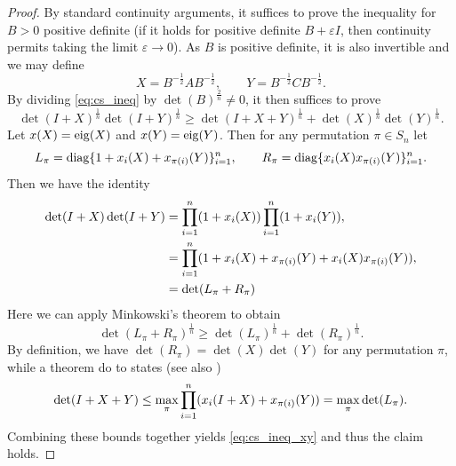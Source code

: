 \documentclass[notitlepage, 10pt]{article}
\begin{document}
\begin{proof}
    By standard continuity arguments, it suffices to prove the inequality for $B > 0$ positive definite (if it holds for positive definite $B+\varepsilon I$, then continuity permits taking the limit $\varepsilon \to 0$).
    As $B$ is positive definite, it is also invertible and we may define
    \begin{equation}
        X = B^{-\frac{1}{2}}AB^{-\frac{1}{2}}, \qquad
        Y = B^{-\frac{1}{2}}CB^{-\frac{1}{2}}.
    \end{equation}
    By dividing \cref{eq:cs_ineq} by $\det(B)^{\frac{2}{n}} \neq 0$, it then suffices to prove
    \begin{equation}
        \label{eq:cs_ineq_xy}
        \det (I+X)^{\frac1n} \det (I+Y)^{\frac1n} \geq \det (I+X+Y)^{\frac1n} + \det (X)^{\frac1n} \det(Y)^{\frac1n}.
    \end{equation}
    Let $x(X) = \operatorname{eig}(X)$ and $x(Y) = \operatorname{eig}(Y)$. Then for any permutation $\pi \in S_n$ let
    \begin{equation}
        L_{\pi} = \operatorname{diag}\{1+x_i(X) + x_{\pi(i)}(Y)\}_{i=1}^{n}, \qquad R_{\pi} = \operatorname{diag}\{x_i(X)x_{\pi(i)}(Y)\}_{i=1}^{n}.
    \end{equation}
    Then we have the identity
    \begin{align}
        \det(I+X)\det(I+Y) 
        &= \prod_{i=1}^{n} (1+x_i(X)) \prod_{i=1}^{n} (1+x_i(Y)), \\
        &= \prod_{i=1}^{n} (1+x_i(X) + x_{\pi(i)}(Y) + x_i(X)x_{\pi(i)}(Y)),\\
        &= \det(L_{\pi} + R_{\pi})
    \end{align} 
    Here we can apply Minkowski's theorem to obtain 
    \begin{equation}
        \det(L_{\pi} + R_{\pi})^{\frac{1}{n}} \geq \det(L_{\pi})^{\frac{1}{n}} + \det(R_{\pi})^{\frac{1}{n}}.
    \end{equation}
    By definition, we have $\det(R_{\pi}) = \det(X)\det(Y)$ for any permutation $\pi$, while a theorem do to \citeauthor{fiedler1971bounds} \cite{fiedler1971bounds} states (see also \cite[Exercise VI.7.2,Theorem VI.7.1]{bhatia1997matrix})
    \begin{equation}
        \det(I+X+Y) \leq \max_{\pi} \prod_{i=1}^{n} (x_i(I+X) + x_{\pi(i)}(Y)) = \max_{\pi} \det(L_{\pi}).
    \end{equation}
    Combining these bounds together yields \cref{eq:cs_ineq_xy} and thus the claim holds. 
\end{proof}
\end{document}

